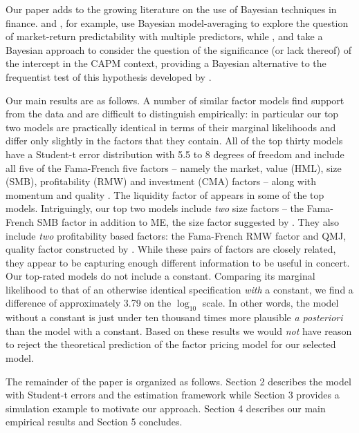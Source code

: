 Our paper adds to the growing literature on the use of Bayesian techniques in finance.
\cite{avramov2002stock} and \cite{cremers2002stock}, for example, use Bayesian model-averaging to explore the question of market-return predictability with multiple predictors, while \cite{shanken1987bayesian}, \cite{harvey1990bayesian} and \cite{avramov2006exact} take a Bayesian approach to consider the question of the significance (or lack thereof) of the intercept in the CAPM context, providing a Bayesian alternative to the frequentist test of this hypothesis developed by \cite{gibbons1989test}.

Our main results are as follows.
A number of similar factor models find support from the data and are difficult to distinguish empirically: in particular our top two models are practically identical in terms of their marginal likelihoods and differ only slightly in the factors that they contain.
All of the top thirty models have a Student-t error distribution with 5.5 to 8 degrees of freedom and include all five of the Fama-French \citep{fama1993common,fama2015five} five factors -- namely the market, value (HML), size (SMB), profitability (RMW) and investment (CMA) factors -- along with momentum \citep{carhart1997persistence} and quality \citep{asness2014quality}.
The liquidity factor of \cite{stambaugh2003liquidity} appears in some of the top models.
Intriguingly, our top two models include \emph{two} size factors -- the Fama-French SMB factor in addition to ME, the size factor suggested by \cite{hou2014digesting}. 
They also include \emph{two} profitability based factors: the Fama-French RMW factor and QMJ, quality factor constructed by  \cite{asness2014quality}.
While these pairs of factors are closely related, they appear to be capturing enough different information to be useful in concert.
Our top-rated models do not include a constant. 
Comparing its marginal likelihood to that of an otherwise identical specification \emph{with} a constant, we find a difference of approximately 3.79 on the $\log_{10}$ scale. 
In other words, the model without a constant is just under ten thousand times more plausible \emph{a posteriori} than the model with a constant.
Based on these results we would \emph{not} have reason to reject the theoretical prediction of the factor pricing model for our selected model.

The remainder of the paper is organized as follows. 
Section 2 describes the model with Student-t errors and the estimation framework while Section 3 provides a simulation example to motivate our approach.
Section 4 describes our main empirical results and Section 5 concludes.

